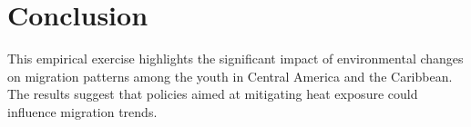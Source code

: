 \documentclass[12pt]{article}
\begin{document}
\section{Conclusion}
This empirical exercise highlights the significant impact of environmental changes on migration patterns among the youth in Central America and the Caribbean. The results suggest that policies aimed at mitigating heat exposure could influence migration trends.


% 
\end{document}
